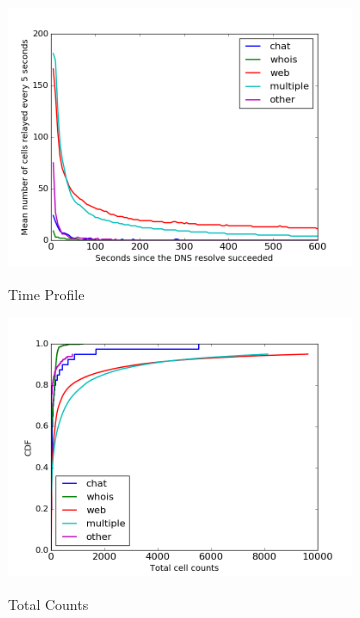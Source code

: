 \begin{figure} \centering
	\begin{subfigure}[t]{0.32\textwidth} \centering
\includegraphics[scale=0.3]{images/exitmeasurement.png}
		\label{fig:stats_a}
		\caption{Time Profile}
	\end{subfigure}
	\begin{subfigure}[t]{0.32\textwidth} \centering
\includegraphics[scale=0.3]{images/totcellcountscdf.png}
		\label{fig:stats_b}
		\caption{Total Counts}
	\end{subfigure}
	\begin{subfigure}[t]{0.32\textwidth} \centering

\end{subfigure}
\end{figure}
